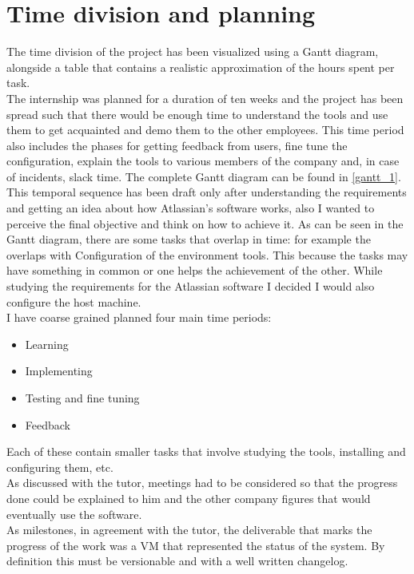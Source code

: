 \section{Time division and planning}\label{sec:time_planning}
	The time division of the project has been visualized using a Gantt diagram, alongside a table that contains a realistic approximation of the hours spent per task.\\
	The internship was planned for a duration of ten weeks and the project has been spread such that there would be enough time to understand the tools and use them to get acquainted and demo them to the other employees.
	This time period also includes the phases for getting feedback from users, fine tune the configuration, explain the tools to various members of the company and, in case of incidents, slack time.
	The complete Gantt diagram can be found in \ref{gantt_1}.\\
	This temporal sequence has been draft only after understanding the requirements and getting an idea about how Atlassian's software works, also I wanted to perceive the final objective and think on how to achieve it.
	As can be seen in the Gantt diagram, there are some tasks that overlap in time: for example the  overlaps with Configuration of the environment tools.
	This because the tasks may have something in common or one helps the achievement of the other.
	While studying the requirements for the Atlassian software I decided I would also configure the host machine.\\
	I have coarse grained planned four main time periods:
	\begin{itemize}
		\item Learning
		\item Implementing
		\item Testing and fine tuning
		\item Feedback
	\end{itemize}
	Each of these contain smaller tasks that involve studying the tools, installing and configuring them, etc.\\
	As discussed with the tutor, meetings had to be considered so that the progress done could be explained to him and the other company figures that would eventually use the software.\\
	As \gls{milestones}, in agreement with the tutor, the deliverable that marks the progress of the work was a VM that represented the status of the system.
	By definition this must be versionable and with a well written changelog.
	